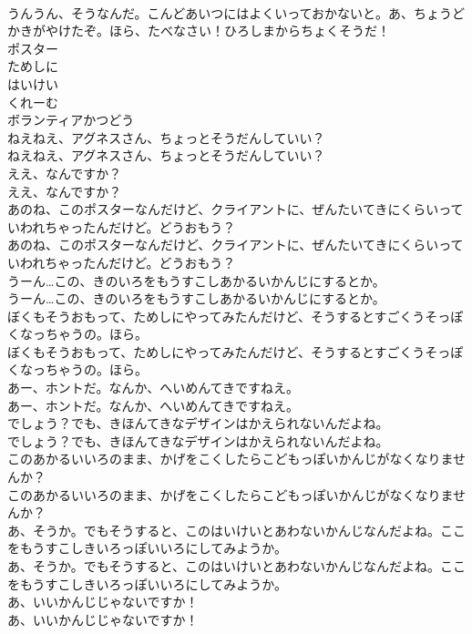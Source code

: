 \documentclass[8pt]{extreport}
\begin{document}
\begin{CJK}{UTF8}{min}
\\	うんうん、そうなんだ。こんどあいつにはよくいっておかないと。あ、ちょうどかきがやけたぞ。ほら、たべなさい！ひろしまからちょくそうだ！
\\	ポスター
\\	ためしに
\\	はいけい
\\	くれーむ
\\	ボランティアかつどう
\\	ねえねえ、アグネスさん、ちょっとそうだんしていい？
\\	ねえねえ、アグネスさん、ちょっとそうだんしていい？
\\	ええ、なんですか？
\\	ええ、なんですか？
\\	あのね、このポスターなんだけど、クライアントに、ぜんたいてきにくらいっていわれちゃったんだけど。どうおもう？
\\	あのね、このポスターなんだけど、クライアントに、ぜんたいてきにくらいっていわれちゃったんだけど。どうおもう？
\\	うーん…この、きのいろをもうすこしあかるいかんじにするとか。
\\	うーん…この、きのいろをもうすこしあかるいかんじにするとか。
\\	ぼくもそうおもって、ためしにやってみたんだけど、そうするとすごくうそっぽくなっちゃうの。ほら。
\\	ぼくもそうおもって、ためしにやってみたんだけど、そうするとすごくうそっぽくなっちゃうの。ほら。
\\	あー、ホントだ。なんか、へいめんてきですねえ。
\\	あー、ホントだ。なんか、へいめんてきですねえ。
\\	でしょう？でも、きほんてきなデザインはかえられないんだよね。
\\	でしょう？でも、きほんてきなデザインはかえられないんだよね。
\\	このあかるいいろのまま、かげをこくしたらこどもっぽいかんじがなくなりませんか？
\\	このあかるいいろのまま、かげをこくしたらこどもっぽいかんじがなくなりませんか？
\\	あ、そうか。でもそうすると、このはいけいとあわないかんじなんだよね。ここをもうすこしきいろっぽいいろにしてみようか。
\\	あ、そうか。でもそうすると、このはいけいとあわないかんじなんだよね。ここをもうすこしきいろっぽいいろにしてみようか。
\\	あ、いいかんじじゃないですか！
\\	あ、いいかんじじゃないですか！

\end{CJK}
\end{document}
